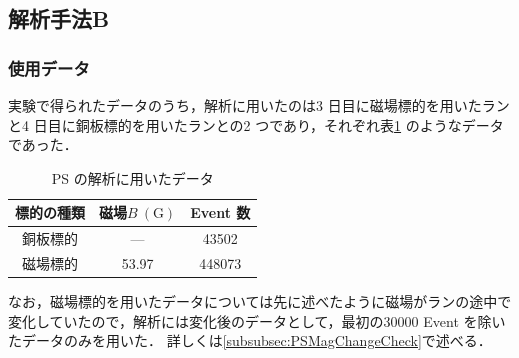 

%

\subsection{解析手法B}
\label{subsec:PSAnalyses}
\subsubsection{使用データ}
\label{subsubsec:PSData}
実験で得られたデータのうち，解析に用いたのは3 日目に磁場標的を用いたランと4 日目に銅板標的を用いたランとの2 つであり，それぞれ表\ref{tab:PSdata} のようなデータであった．
\begin{table}[h]
	\centering
	\caption{PS の解析に用いたデータ}
	\begin{tabular}{ccc} \toprule
	標的の種類 & 磁場$B~(\mathrm{G})$ & Event 数 \\ \midrule
	銅板標的 & --- & 43502 \\
	磁場標的 & 53.97 & 448073 \\ \bottomrule
	\end{tabular}\label{tab:PSdata}
\end{table}%

なお，磁場標的を用いたデータについては先に述べたように磁場がランの途中で変化していたので，解析には変化後のデータとして，最初の30000 Event を除いたデータのみを用いた．
詳しくは\ref{subsubsec:PSMagChangeCheck}で述べる．

